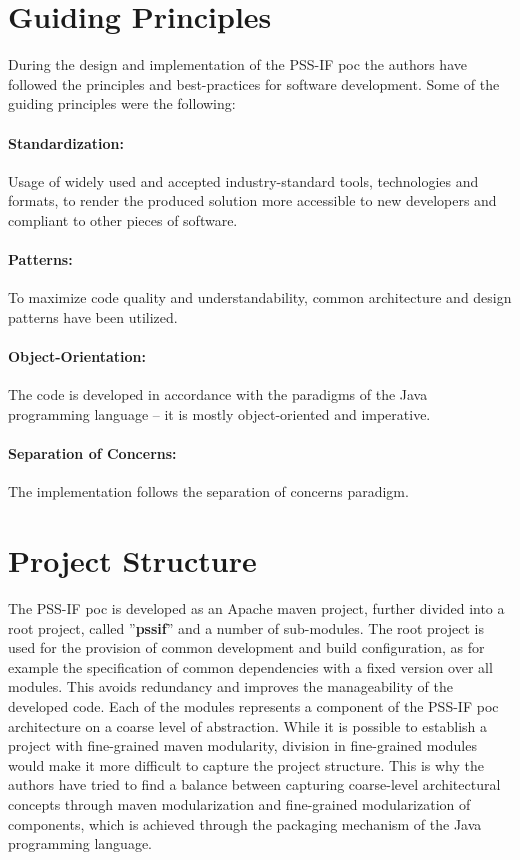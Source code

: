 \section{Guiding Principles}
\label{sec:impl:principles}

During the design and implementation of the PSS-IF \gls{poc} the authors have followed the principles and best-practices for software development. Some of the guiding principles were the following:

\paragraph{Standardization:} Usage of widely used and accepted industry-standard tools, technologies and formats, to render the produced solution more accessible to new developers and compliant to other pieces of software.

\paragraph{Patterns:} To maximize code quality and understandability, common architecture and design patterns have been utilized.

\paragraph{Object-Orientation:} The code is developed in accordance with the paradigms of the Java programming language -- it is mostly object-oriented and imperative.

\paragraph{Separation of Concerns:} The implementation follows the separation of concerns paradigm.

\section{Project Structure}
\label{sec:impl:structure}

The PSS-IF \gls{poc} is developed as an Apache maven project, further divided into a root project, called ''\textbf{pssif}'' and a number of sub-modules. The root project is used for the provision of common development and  build configuration, as for example the specification of common dependencies with a fixed version over all modules. This avoids redundancy and improves the manageability of the developed code. Each of the modules represents a component of the PSS-IF \gls{poc} architecture on a coarse level of abstraction. While it is possible to establish a project with fine-grained maven modularity, division in fine-grained modules would make it more difficult to capture the project structure. This is why the authors have tried to find a balance between capturing coarse-level architectural concepts through maven modularization and fine-grained modularization of components, which is achieved through the packaging mechanism of the Java programming language.

